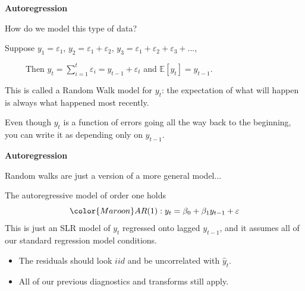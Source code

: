 \documentclass[12pt,xcolor=svgnames]{beamer}
\newcommand{\bk}{\color{black}}
\newcommand{\nv}{\color{Navy}}
\newcommand{\theme}{\color{Maroon}}
\newcommand{\ds}[1]{\mathds{#1}}
\newcommand{\sk}{\vspace{.5cm}}
\begin{document}
\begin{frame}

{\bf Autoregression}

\sk

How do we model this type of data?

\sk Suppose $y_1 = \varepsilon_1$, $y_2 = \varepsilon_{1} +
\varepsilon_{2}$, $y_3 = \varepsilon_{1} + \varepsilon_{2} + \varepsilon_{3} +...$,

\sk
\nv
~~~~~Then $y_t =  \sum_{i=1}^{t}\varepsilon_i = y_{t-1} + \varepsilon_t$ and $\ds{E}[y_t] = y_{t-1}$.\bk

\sk
This is called a \theme Random Walk \bk model for $y_t$:  the expectation of what will happen is always what happened most recently.

\sk
Even though $y_t$ is a function of errors going all the way back to the beginning, you can
write it as depending only on $y_{t-1}$.
\end{frame}


\begin{frame}

{\bf Autoregression}
\sk

Random walks are just a version of a more general model...

\sk
The \nv autoregressive \bk model of order one holds 
\[
\theme AR(1): y_t = \beta_0 + \beta_1y_{t-1} + \varepsilon
\]
This is just an SLR model of $y_t$ regressed onto lagged $y_{t-1}$,
and it assumes all of our standard regression model conditions.

\begin{itemize}
\item The residuals should look $iid$ and be uncorrelated with $\hat{y}_t$.
\item All of our previous diagnostics and transforms still apply.
\end{itemize} 

\end{frame}


\end{document}

